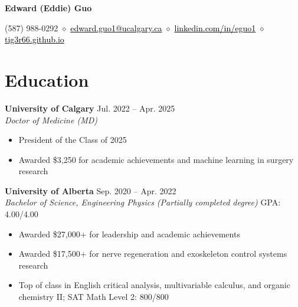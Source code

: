 \documentclass{article}
\begin{document}
\thispagestyle{plain}
\begin{center}
\LARGE \textbf{\textcolor{my_colour}{Edward (Eddie) Guo}} \vspace{.2em}

\normalfont \normalsize
(587) 988-0292
    \hspace{.15em} $\diamond$ \hspace{.15em}
\href{mailto:edward.guo1@ucalgary.ca}{\textcolor{black}{edward.guo1@ucalgary.ca}}
    \hspace{.15em} $\diamond$ \hspace{.15em}
\href{https://www.linkedin.com/in/eguo1}{\textcolor{black}{linkedin.com/in/eguo1}}
    \hspace{.15em} $\diamond$ \hspace{.15em}
\href{https://tig3r66.github.io/index.html}{\textcolor{black}{tig3r66.github.io}}
\end{center}

\vspace{-1em}


\section*{\textcolor{my_colour}{Education}}
\vspace{-.25em} \hrulefill \vspace{.25em}

\textbf{University of Calgary} \hfill Jul. 2022 -- Apr. 2025 \\
\textit{Doctor of Medicine (MD)}
\begin{itemize}
    \item President of the Class of 2025
    \item Awarded \$3,250 for academic achievements and machine learning in surgery research
\end{itemize} \vspace{1em}

\textbf{University of Alberta} \hfill Sep. 2020 -- Apr. 2022 \\
\textit{Bachelor of Science, Engineering Physics (Partially completed degree)} \hfill GPA: 4.00/4.00
\begin{itemize}
    \item Awarded \$27,000+ for leadership and academic achievements
    \item Awarded \$17,500+ for nerve regeneration and exoskeleton control systems research
    \item Top of class in English critical analysis, multivariable calculus, and organic chemistry II; SAT Math Level 2: 800/800
\end{itemize} \vspace{1em}
\end{document}
